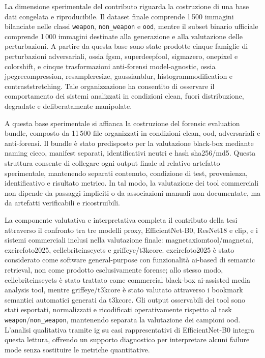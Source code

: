La dimensione sperimentale del contributo riguarda la costruzione di una base
dati congelata e riproducibile. Il dataset finale comprende 1\,500 immagini
bilanciate nelle classi \texttt{weapon}, \texttt{non\_weapon} e \texttt{ood},
mentre il subset binario ufficiale comprende 1\,000 immagini destinate alla
generazione e alla valutazione delle perturbazioni. A partire da questa base sono
state prodotte cinque famiglie di perturbazioni adversariali, ossia \gls{fgsm},
\gls{superdeepfool}, \gls{sigmazero}, \gls{onepixel} e \gls{colorshift}, e
cinque trasformazioni anti-forensi model-agnostic, ossia
\gls{jpegrecompression}, \gls{resampleresize}, \gls{gaussianblur},
\gls{histogrammodification} e \gls{contraststretching}. Tale organizzazione ha
consentito di osservare il comportamento dei sistemi analizzati in condizioni
clean, fuori distribuzione, degradate e deliberatamente manipolate.

A questa base sperimentale si affianca la costruzione del forensic evaluation
bundle, composto da 11\,500 file organizzati in condizioni clean, \gls{ood},
adversariali e anti-forensi. Il bundle è stato predisposto per la valutazione
black-box mediante naming cieco, manifest separati, identificativi neutri e hash
\gls{sha256}/\gls{md5}. Questa struttura consente di collegare ogni output finale
al relativo artefatto sperimentale, mantenendo separati contenuto, condizione di
test, provenienza, identificativo e risultato metrico. In tal modo, la valutazione
dei tool commerciali non dipende da passaggi impliciti o da associazioni manuali
non documentate, ma da artefatti verificabili e ricostruibili.

La componente valutativa e interpretativa completa il contributo della tesi
attraverso il confronto tra tre modelli proxy, EfficientNet-B0, ResNet18 e
\gls{clip}, e i sistemi commerciali inclusi nella valutazione finale:
\gls{magnetaxiomtool}/\gls{magnetai}, \gls{excirefoto2025},
\gls{cellebriteinseyets} e \gls{griffeye}/\gls{t3kcore}. \gls{excirefoto2025} è
stato considerato come software general-purpose con funzionalità \gls{ai}-based
di semantic retrieval, non come prodotto esclusivamente forense; allo stesso
modo, \gls{cellebriteinseyets} è stato trattato come commercial black-box
\gls{ai}-assisted media analysis tool, mentre \gls{griffeye}/\gls{t3kcore} è
stato valutato attraverso i bookmark semantici automatici generati da
\gls{t3kcore}. Gli output osservabili dei tool sono stati esportati,
normalizzati e ricodificati operativamente rispetto al task
\texttt{weapon}/\texttt{non\_weapon}, mantenendo separata la valutazione dei
campioni \gls{ood}. L'analisi qualitativa tramite \gls{ig} su casi
rappresentativi di EfficientNet-B0 integra questa lettura, offrendo un supporto
diagnostico per interpretare alcuni failure mode senza sostituire le metriche
quantitative.



